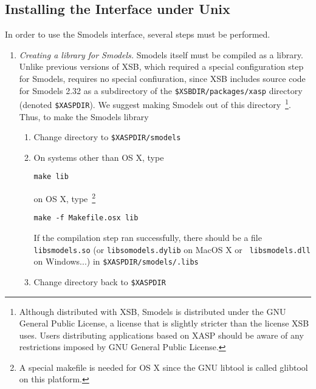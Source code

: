 \subsection{Installing the Interface under Unix}

In order to use the Smodels interface, several steps must be
performed.  

\begin{enumerate}
\item {\em Creating a library for Smodels.} Smodels itself must be
  compiled as a library.  Unlike previous versions of XSB, which
  required a special configuration step for Smodels, \version{}
  requires no special confiuration, since XSB includes source code for
  Smodels 2.32 as a subdirectory of the {\tt \$XSBDIR/packages/xasp}
  directory (denoted {\tt \$XASPDIR}).  We suggest making Smodels out
  of this directory~\footnote{Although distributed with XSB, Smodels
    is distributed under the GNU General Public License, a license
    that is slightly stricter than the license XSB uses.  Users
    distributing applications based on XASP should be aware of any
    restrictions imposed by GNU General Public License.}.  Thus, to
  make the Smodels library
\begin{enumerate}
  \item Change directory to {\tt \$XASPDIR/smodels}
  \item On systems other than OS X, type
\begin{center}
 {\tt make lib}
\end{center}
  on OS X, type~\footnote{A special makefile is needed for OS X since
    the GNU libtool is called glibtool on this platform.}
\begin{center}
 {\tt make -f Makefile.osx lib}
\end{center}
%
%
  If the compilation step ran successfully, there should be a file
  {\tt libsmodels.so} (or {\tt libsomodels.dylib} on MacOS X or {\tt
    libsmodels.dll} on Windows...) in {\tt \$XASPDIR/smodels/.libs}
  \item Change directory back to {\tt \$XASPDIR}
\end{enumerate}



\end{enumerate}
